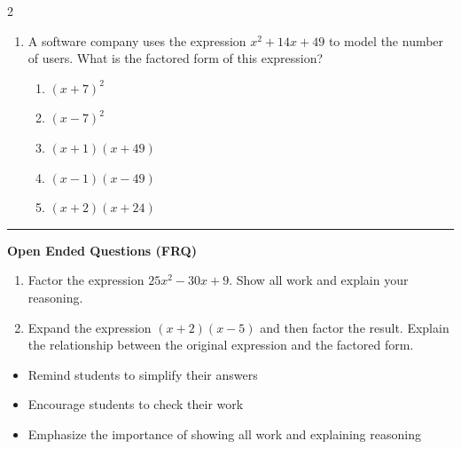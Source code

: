 \documentclass[10pt]{article}
\begin{document}
\begin{multicols}{2}
\begin{enumerate}[label=\textbf{Q\arabic*.}, leftmargin=*, itemsep=6pt, parsep=0pt]
  \item \small A software company uses the expression $x^2 + 14x + 49$ to model the number of users. What is the factored form of this expression?
  \begin{enumerate}[label=(\Alph*), leftmargin=0.6cm, nosep, itemsep=2pt]
    \item $(x + 7)^2$
    \item $(x - 7)^2$
    \item $(x + 1)(x + 49)$
    \item $(x - 1)(x - 49)$
    \item $(x + 2)(x + 24)$
  \end{enumerate}

\end{enumerate}
\end{multicols}

\vspace{-0.2cm}
\hrule
\vspace{0.2cm}
\textbf{\small Open Ended Questions (FRQ)}
\begin{enumerate}[label=\textbf{Q\arabic*.}, start=9, itemsep=5pt, topsep=0pt]

  \item \small Factor the expression $25x^2 - 30x + 9$. Show all work and explain your reasoning. \vspace{2cm}

  \item \small Expand the expression $(x + 2)(x - 5)$ and then factor the result. Explain the relationship between the original expression and the factored form. \vspace{2cm}

\end{enumerate}

\vfill

\begin{tcolorbox}[colback=blue!5, colframe=mainblue!50, title=\small \textbf{Chef's Tips}, fonttitle=\bfseries, bottom=1mm]
\begin{itemize}[noitemsep, topsep=2pt, leftmargin=0.5cm]
  \item \scriptsize Remind students to simplify their answers\item \scriptsize Encourage students to check their work\item \scriptsize Emphasize the importance of showing all work and explaining reasoning
\end{itemize}
\end{tcolorbox}
\end{document}
